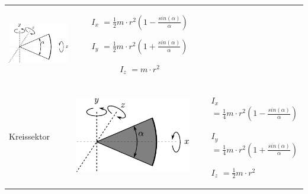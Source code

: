\begin{table}[h!]
\begin{tabular}{m{2cm} c m{}}
\begin{minipage}{0.3\textwidth}
        \centering
        \includegraphics[scale=\traegscale]{traeg/traeg-kreisbogen.pdf}
        \end{minipage} &
                \begin{itemize}
                \item[$I_x$]$= \frac12 m \cdot r^2 
                        \left(1-\frac{sin(\alpha)}{\alpha} \right)$
                \item[$I_y$]$= \frac12 m \cdot r^2
                        \left(1+\frac{sin(\alpha)}{\alpha} \right)$
                \item[$I_z$]$= m \cdot r^2$
                \end{itemize} \\
Kreissektor &
        \begin{minipage}{0.3\textwidth}
        \centering
        \includegraphics[scale=\traegscale]{traeg/traeg-kreissektor.pdf}
        \end{minipage} &
                \begin{itemize}
                \item[$I_x$]$= \frac14 m \cdot r^2
                        \left(1-\frac{sin(\alpha)}{\alpha} \right)$
                \item[$I_y$]$= \frac14 m \cdot r^2
                        \left(1+\frac{sin(\alpha)}{\alpha} \right)$
                \item[$I_z$]$= \frac12 m \cdot r^2$        

\end{itemize}
\end{tabular}
\end{table}
